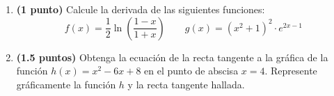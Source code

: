 
\begin{enumerate}[label=\alph*)]
  \item \textbf{(1 punto)} Calcule la derivada de las siguientes funciones:
  \[
    f(x)=\frac{1}{2}\ln\left(\frac{1-x}{1+x}\right)
    \qquad
    g(x)=(x^2+1)^2\cdot e^{2x-1}
  \]
  \item \textbf{(1.5 puntos)} Obtenga la ecuación de la recta tangente a la
  gráfica de la función $h(x)=x^2-6x+8$ en el punto de abscisa $x=4$.
  Represente gráficamente la función $h$ y la recta tangente hallada.
\end{enumerate}

